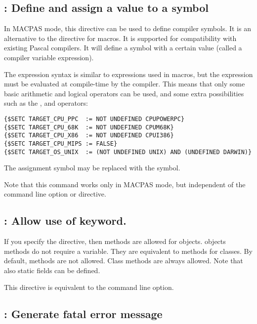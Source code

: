\subsection{ : Define and assign a value to a symbol}

In MACPAS mode, this directive can be used to define compiler symbols. It is
an alternative to the  directive for macros. It is supported for 
compatibility with existing \macos Pascal compilers. It will define a symbol
with a certain value (called a compiler variable expression). 

The expression syntax is similar to expressions used in macros, but the
expression must be evaluated at compile-time by the compiler. This means
that only some basic arithmetic and logical operators can be used,
and some extra possibilities such as the , and 
operators:
\begin{verbatim}
{$SETC TARGET_CPU_PPC  := NOT UNDEFINED CPUPOWERPC}
{$SETC TARGET_CPU_68K  := NOT UNDEFINED CPUM68K}
{$SETC TARGET_CPU_X86  := NOT UNDEFINED CPUI386}
{$SETC TARGET_CPU_MIPS := FALSE}
{$SETC TARGET_OS_UNIX  := (NOT UNDEFINED UNIX) AND (UNDEFINED DARWIN)}
\end{verbatim}
The \var{:=} assignment symbol may be replaced with the \var{=} symbol.

Note that this command works only in MACPAS mode, but independent of the
 command line option or  directive.


\subsection{ : Allow use of  keyword.}

If you specify the  directive, then 
methods are allowed for objects.  objects methods do not require
a  variable. They are equivalent to  methods for
classes. By default,  methods are not allowed. Class methods
are always allowed. Note that also static fields can be defined.

This directive is equivalent to the  command line option.

\subsection{ : Generate fatal error message}

